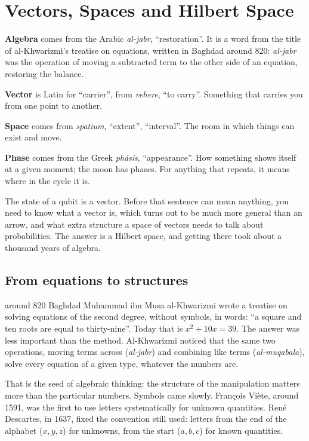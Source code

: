 \chapter{Vectors, Spaces and Hilbert Space}\label{ch:hilbert}

\begin{etymology}
\textbf{Algebra} comes from the Arabic \emph{al-jabr}, ``restoration''. It is a
word from the title of al-Khwarizmi's treatise on equations, written in Baghdad
around 820: \emph{al-jabr} was the operation of moving a subtracted term to the
other side of an equation, restoring the balance.

\textbf{Vector} is Latin for ``carrier'', from \emph{vehere}, ``to carry''.
Something that carries you from one point to another.

\textbf{Space} comes from \emph{spatium}, ``extent'', ``interval''. The room in
which things can exist and move.

\textbf{Phase} comes from the Greek \emph{phásis}, ``appearance''. How something
shows itself at a given moment; the moon has phases. For anything that repeats,
it means where in the cycle it is.
\end{etymology}

The state of a qubit is a vector. Before that sentence can mean anything, you need
to know what a vector is, which turns out to be much more general than an arrow,
and what extra structure a space of vectors needs to talk about probabilities.
The answer is a Hilbert space, and getting there took about a thousand years of
algebra.

\section{From equations to structures}

\begin{history}{around 820 \textperiodcentered{} Baghdad}
Muhammad ibn Musa al-Khwarizmi wrote a treatise on solving equations of the
second degree, without symbols, in words: ``a square and ten roots are equal to
thirty-nine''. Today that is $x^2 + 10x = 39$. The answer was less important than
the method. Al-Khwarizmi noticed that the same two operations, moving terms across
(\emph{al-jabr}) and combining like terms (\emph{al-muqabala}), solve every
equation of a given type, whatever the numbers are.
\end{history}

That is the seed of algebraic thinking: the structure of the manipulation
matters more than the particular numbers. Symbols came slowly. François Viète,
around 1591, was the first to use letters systematically for unknown quantities.
René Descartes, in 1637, fixed the convention still used: letters from the end of
the alphabet ($x, y, z$) for unknowns, from the start ($a, b, c$) for known
quantities.

